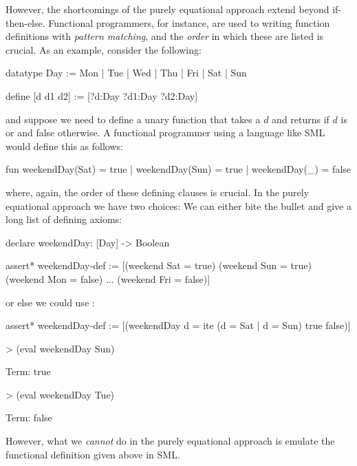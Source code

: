 However, the shortcomings of the purely equational approach extend beyond if-then-else.
Functional programmers, for instance, are used to writing function definitions with {\em pattern matching},
and the {\em order\/} in which these are listed is crucial. As an example, consider the following: 
\begin{tcAthena}
datatype Day := Mon | Tue | Wed | Thu | Fri | Sat | Sun

define [d d1 d2] := [?d:Day ?d1:Day ?d2:Day]
\end{tcAthena}
and suppose we need to define a unary function  that takes a  $d$ and returns  if $d$
is  or  and false otherwise. A functional programmer using a language like SML would define this as follows:
\begin{tcAthena}
fun weekendDay(Sat) = true
  | weekendDay(Sun) = true
  | weekendDay(_) = false
\end{tcAthena}
where, again, the order of these defining clauses is crucial.
In the purely equational approach we have two choices: We can either bite the bullet and give a long list of defining axioms:
\begin{tcAthena}
declare weekendDay: [Day] -> Boolean

assert* weekendDay-def :=
  [(weekend Sat = true)
   (weekend Sun = true)
   (weekend Mon = false)
   ...
   (weekend Fri = false)]
\end{tcAthena}
or else we could use : 
\begin{tcAthena}
assert* weekendDay-def := [(weekendDay d = ite (d = Sat | d = Sun) true false)]

> (eval weekendDay Sun)

Term: true

> (eval weekendDay Tue)

Term: false
\end{tcAthena}
However, what we \emph{cannot} do in the purely equational approach is emulate the functional definition given above in SML.

